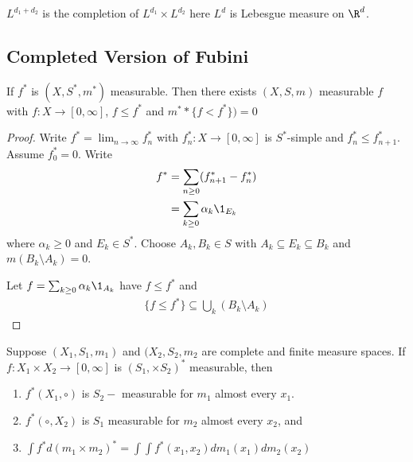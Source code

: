 \begin{corollary}
	$L^{d_1 + d_2}$ is the completion of $L^{d_1} \times L^{d_2}$ here $L^d$ is Lebesgue measure on $\R^d$.
\end{corollary}

\subsection{Completed Version of Fubini}

\begin{lemma} If $f^*$ is  $(X, S^*, m^*)$ measurable. 
	Then there exists $(X, S, m)$ measurable $f$ with $f: X \to [0,\infty]$, $f \leq f^*$ and $m^* * \{f < f^* \}) = 0$
\end{lemma}

\begin{proof}
	Write $f^* = \lim_{n \to \infty} f_n^*$ with $f_{n}^* : X \to [0, \infty]$ is $S^*$-simple and 
	$f_n^* \leq f_{n+1}^*$.
	Assume $f_{0}^* = 0$. Write
	\begin{align*}
		f^* &= \sum_{n \geq 0} (f_{n+1}^* - f_n^*) \\
			&= \sum_{k \geq 0} \alpha_{k} \1_{E_k}
	\end{align*}
	where $\alpha_k \geq 0$ and $E_k \in S^*$. Choose $A_k, B_k \in S$ with $A_k \subseteq E_k \subseteq B_k$ and
	$m(B_k \setminus A_k) = 0$.

	Let $f = \sum_{k \geq 0} \alpha_{k} \1_{A_k}$ have $f \leq f^*$ and
	\begin{align*}
		\{ f \leq f^* \} \subseteq \bigcup_{k} (B_{k} \setminus A_k)
	\end{align*} 
\end{proof}

\begin{theorem}
	Suppose $(X_1, S_1, m_1)$ and $(X_2, S_2, m_2$ are complete and finite measure spaces.
	If $f: X_1 \times X_2 \to [0,\infty]$ is $(S_1, \times S_2)^*$ measurable, then
	\begin{enumerate}
		\item $f^*(X_1, \circ)$ is $S_2-$ measurable for $m_1$ almost every $x_1$.
		\item $f^*(\circ, X_2)$ is $S_1$ measurable for $m_2$ almost every $x_2$, and
		\item $\int f^* d(m_1 \times m_2)^* = \int \int f^*(x_1, x_2) dm_1(x_1) dm_2 (x_2)$
	\end{enumerate}
\end{theorem}


